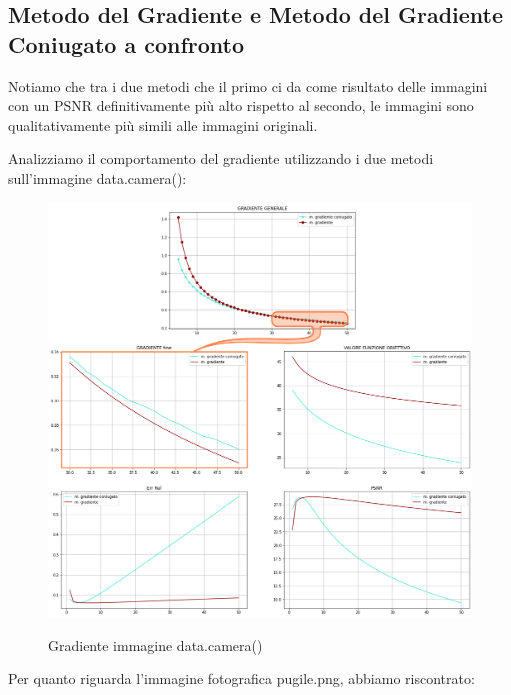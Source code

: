 \subsection{Metodo del Gradiente e Metodo del Gradiente Coniugato a confronto}

Notiamo che tra i due metodi che il primo ci da come risultato delle immagini con un PSNR 
definitivamente più alto rispetto al secondo, le immagini sono qualitativamente più simili 
alle immagini originali. 

Analizziamo il comportamento del gradiente utilizzando i due metodi sull'immagine data.camera():
\begin{figure}[H]
    \centering
    \includegraphics[width=\textwidth]{output/MGCvsMG-enph.png}
    \label{fig:MGCvsMG}
    \caption{Gradiente immagine data.camera()}
\end{figure}

Per quanto riguarda l'immagine fotografica pugile.png, abbiamo riscontrato: 

